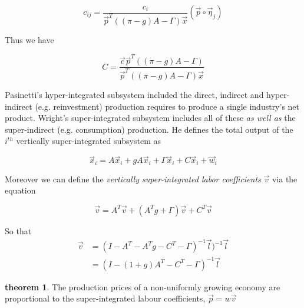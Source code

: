 \documentclass{article}
\theoremstyle{definition}
\newtheorem{theorem}{theorem}[section]
\begin{document}
\begin{equation}
    c_{ij} = \frac{c_i}{\vec{p}^T((\pi-g)A-\Gamma)\vec{x}}(\vec{p}\circ \vec{\eta}_j)
\end{equation}

Thus we have

\begin{equation}
    C = \frac{\vec{c}\vec{p}^T((\pi-g)A-\Gamma)}{\vec{p}^T((\pi-g)A-\Gamma)\vec{x}}
\end{equation}

Pasinetti's hyper-integrated subsystem included the direct, indirect and hyper-indirect (e.g. reinvestment) production requires to produce a single industry's net product. Wright's super-integrated subsystem includes all of these \emph{as well as} the super-indirect (e.g. consumption) production. He defines the total output of the $i^{th}$ vertically super-integrated subsystem as 

\begin{equation}
    \vec{x}_i = A\vec{x}_i+gA\vec{x}_i+\Gamma\vec{x}_i+C\vec{x}_i+\vec{w}_i
\end{equation}

Moreover we can define the \emph{vertically super-integrated labor coefficients} $\vec{v}$ via the equation

\begin{equation}
    \vec{v} = A^T\vec{v}+(A^Tg+\Gamma)\vec{v}+C^T\vec{v}
\end{equation}

So that 
\begin{align}
    \vec{v} &= (I-A^T-A^Tg-C^T-\Gamma)^{-1}\vec{l})^{-1}\vec{l} \\
            &= (I-(1+g)A^T-C^T-\Gamma)^{-1}\vec{l}
\end{align}
\begin{theorem}
    The production prices of a non-uniformly growing economy are proportional to the super-integrated labour coefficients, $\vec{p} = w\vec{v}$
\end{theorem}
\end{document}
